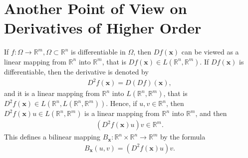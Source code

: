 \documentclass[10pt]{book}
\theoremstyle{definition}
\numberwithin{equation}{chapter}
\begin{document}
\medskip



\section{Another Point of View on Derivatives of Higher Order}

If $f: \Omega \to \mathbb{R}^m, \Omega \subset \mathbb{R}^n$ is differentiable in $\Omega$, then $Df(\mathbf{x})$ can be viewed as a linear mapping from $\mathbb{R}^n$ into $\mathbb{R}^m$, that is $Df(\mathbf{x}) \in L(\mathbb{R}^n, \mathbb{R}^m)$. If $Df(\mathbf{x})$ is differentiable, then the derivative is denoted by 
\begin{align*}
    D^2f(\mathbf{x}) = D(Df)(\mathbf{x}),
\end{align*}
and it is a linear mapping from $\mathbb{R}^n$ into $L(\mathbb{R}^n, \mathbb{R}^m)$, that is $D^2f(\mathbf{x}) \in L(\mathbb{R}^n, L(\mathbb{R}^n, \mathbb{R}^m))$. Hence, if $u, v \in \mathbb{R}^n$, then $D^2f(\mathbf{x})u \in L(\mathbb{R}^n, \mathbb{R}^m)$ is a linear mapping from $\mathbb{R}^n$ into $\mathbb{R}^m$, and then
\begin{align*}
    \left(D^2f(\mathbf{x})u\right)v \in \mathbb{R}^m.
\end{align*}
This defines a bilinear mapping $B_{\mathbf{x}}: \mathbb{R}^n \times \mathbb{R}^n \to \mathbb{R}^m$ by the formula
\begin{align*}
    B_{\mathbf{x}}(u,v) = \left(D^2f(\mathbf{x})u\right)v.
\end{align*}

\medskip
\end{document}
